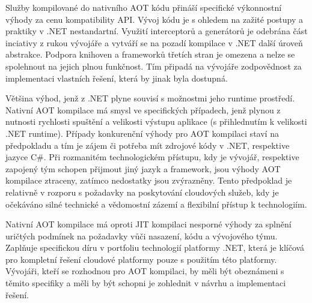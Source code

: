 

Služby kompilované do nativního AOT kódu přináší specifické výkonnostní výhody za cenu kompatibility API. Vývoj kódu je s ohledem na zažité postupy a praktiky v .NET nestandartní. Využití interceptorů a generátorů je odebrána část inciativy z rukou vývojáře a vytváří se na pozadí kompilace v .NET další úroveň abstrakce. Podpora knihoven a frameworků třetích stran je omezena a nelze se spolehnout na jejich plnou funkčnost. Tím připadá na vývojáře zodpovědnost za implementaci vlastních řešení, která by jinak byla dostupná.

Většina výhod, jenž z .NET plyne souvisí s možnostmi jeho runtime prostředí. Nativní AOT kompilace má smysl ve specifických případech, jenž plynou z nutnosti rychlosti spuštění a velikosti výstupu aplikace (s přihlednutím k velikosti .NET runtime). Případy konkurenční výhody pro AOT kompilaci staví na předpokladu a tím je zájem či potřeba mít zdrojové kódy v .NET, respektive jazyce C\#. Při rozmanitém technologickém přístupu, kdy je vývojář, respektive zapojený tým schopen přijmout jiný jazyk a framework, jsou výhody AOT kompilace ztraceny, zatímco nedostatky jsou zvýrazněny. Tento předpoklad je relativně v rozporu s požadavky na poskytování cloudových služeb, kdy je očekáváno silné technické a vědomostní zázemí a flexibilní přístup k technologiím.

Nativní AOT kompilace má oproti JIT kompilaci nesporné výhody za splnění uričtých podmínek na požadavky vůči nasazení, kódu a vývojového týmu. Zaplňuje specifickou díru v portfoliu technologií platformy .NET, která je klíčová pro kompletní řešení cloudové platformy pouze s použitím této platformy. Vývojáři, kteří se rozhodnou pro AOT kompilaci, by měli být obeznámeni s těmito specifiky a měli by být schopni je zohlednit v návrhu a implementaci řešení.
